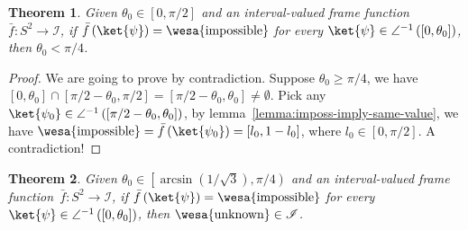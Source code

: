 \documentclass[12pt]{iopart}
\theoremstyle{plain}
\newtheorem{thm}{Theorem}
\theoremstyle{definition}
\theoremstyle{remark}
\newcommand{\imposs}{{\mbox{\wesa{impossible}}}}
\newcommand{\unknown}{{\mbox{\wesa{unknown}}}}
\begin{document}
\begin{thm}\label{thm:pi-div-4}Given $\theta_{0}\in\left[0,\pi / 2\right]$
and an interval-valued frame function~$\bar{f}:S^{2}\rightarrow\mathscr{I}$,
if $\bar{f}\left(\ket{\psi}\right)=\imposs$ for every $\ket{\psi}\in\angle^{-1}\left(\left[0,\theta_{0}\right]\right)$,
then $\theta_{0}<\pi / 4$.\end{thm}
\begin{proof}
We are going to prove by contradiction. Suppose $\theta_{0}\ge\pi / 4$,
we have $\left[0,\theta_{0}\right]\cap\left[\pi / 2-\theta_{0},\pi / 2\right]=\left[\pi / 2-\theta_{0},\theta_{0}\right]\ne\emptyset$.
Pick any $\ket{\psi_{0}}\in\angle^{-1}\left(\left[\pi / 2-\theta_{0},\theta_{0}\right]\right)$,
by lemma~\ref{lemma:imposs-imply-same-value}, we have $\imposs=\bar{f}\left(\ket{\psi_{0}}\right)=\left[l_{0},1-l_{0}\right]$,
where $l_{0}\in\left[0,\pi / 2\right]$. A contradiction!
\end{proof}
\begin{thm}\label{thm:arcsin-one-over-sqrt-three}Given $\theta_{0}\in\left[\arcsin\left(1 / \sqrt{3}\right),\pi / 4\right)$
and an interval-valued frame function~$\bar{f}:S^{2}\rightarrow\mathscr{I}$,
if $\bar{f}\left(\ket{\psi}\right)=\imposs$ for every $\ket{\psi}\in\angle^{-1}\left(\left[0,\theta_{0}\right]\right)$,
then $\unknown\in\mathscr{I}$.\end{thm}
\end{document}
